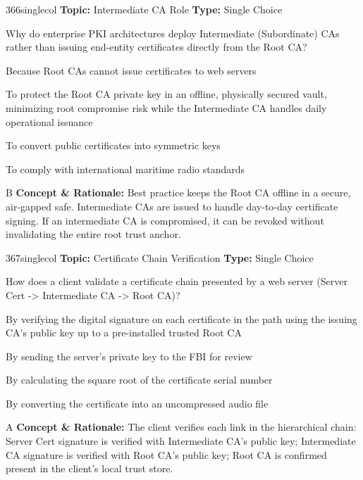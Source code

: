 \begin{qcard}{366}{singlecol}
\textcolor{darkslate!75}{\small\textbf{Topic:} Intermediate CA Role \hfill \textbf{Type:} Single Choice}\vspace{0.4em}\par
Why do enterprise PKI architectures deploy Intermediate (Subordinate) CAs rather than issuing end-entity certificates directly from the Root CA?
\begin{qoptions}
\item Because Root CAs cannot issue certificates to web servers
\item To protect the Root CA private key in an offline, physically secured vault, minimizing root compromise risk while the Intermediate CA handles daily operational issuance
\item To convert public certificates into symmetric keys
\item To comply with international maritime radio standards
\end{qoptions}
\end{qcard}
\nopagebreak
\begin{explainbox}{B}
\textbf{Concept \& Rationale:} Best practice keeps the Root CA offline in a secure, air-gapped safe. Intermediate CAs are issued to handle day-to-day certificate signing. If an intermediate CA is compromised, it can be revoked without invalidating the entire root trust anchor.
\end{explainbox}

\begin{qcard}{367}{singlecol}
\textcolor{darkslate!75}{\small\textbf{Topic:} Certificate Chain Verification \hfill \textbf{Type:} Single Choice}\vspace{0.4em}\par
How does a client validate a certificate chain presented by a web server (Server Cert -\textgreater{} Intermediate CA -\textgreater{} Root CA)?
\begin{qoptions}
\item By verifying the digital signature on each certificate in the path using the issuing CA's public key up to a pre-installed trusted Root CA
\item By sending the server's private key to the FBI for review
\item By calculating the square root of the certificate serial number
\item By converting the certificate into an uncompressed audio file
\end{qoptions}
\end{qcard}
\nopagebreak
\begin{explainbox}{A}
\textbf{Concept \& Rationale:} The client verifies each link in the hierarchical chain: Server Cert signature is verified with Intermediate CA's public key; Intermediate CA signature is verified with Root CA's public key; Root CA is confirmed present in the client's local trust store.
\end{explainbox}

